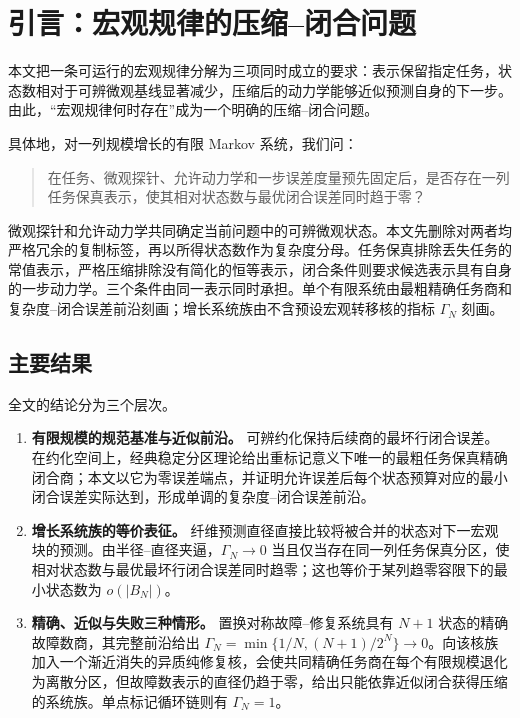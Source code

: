 \section{引言：宏观规律的压缩--闭合问题}
\label{sec:introduction}

本文把一条可运行的宏观规律分解为三项同时成立的要求：表示保留指定任务，状态数相对于可辨微观基线显著减少，压缩后的动力学能够近似预测自身的下一步。由此，“宏观规律何时存在”成为一个明确的压缩--闭合问题。

具体地，对一列规模增长的有限 Markov 系统，我们问：

\begin{quote}
在任务、微观探针、允许动力学和一步误差度量预先固定后，是否存在一列任务保真表示，使其相对状态数与最优闭合误差同时趋于零？
\end{quote}

微观探针和允许动力学共同确定当前问题中的可辨微观状态。本文先删除对两者均严格冗余的复制标签，再以所得状态数作为复杂度分母。任务保真排除丢失任务的常值表示，严格压缩排除没有简化的恒等表示，闭合条件则要求候选表示具有自身的一步动力学。三个条件由同一表示同时承担。单个有限系统由最粗精确任务商和复杂度--闭合误差前沿刻画；增长系统族由不含预设宏观转移核的指标 $\Gamma_N$ 刻画。

\subsection{主要结果}

全文的结论分为三个层次。

\begin{enumerate}
  \item \textbf{有限规模的规范基准与近似前沿。} 可辨约化保持后续商的最坏行闭合误差。在约化空间上，经典稳定分区理论给出重标记意义下唯一的最粗任务保真精确闭合商；本文以它为零误差端点，并证明允许误差后每个状态预算对应的最小闭合误差实际达到，形成单调的复杂度--闭合误差前沿。
  \item \textbf{增长系统族的等价表征。} 纤维预测直径直接比较将被合并的状态对下一宏观块的预测。由半径--直径夹逼，$\Gamma_N\to0$ 当且仅当存在同一列任务保真分区，使相对状态数与最优最坏行闭合误差同时趋零；这也等价于某列趋零容限下的最小状态数为 $o(|B_N|)$。
  \item \textbf{精确、近似与失败三种情形。} 置换对称故障--修复系统具有 $N+1$ 状态的精确故障数商，其完整前沿给出 $\Gamma_N=\min\{1/N,(N+1)/2^N\}\to0$。向该核族加入一个渐近消失的异质纯修复核，会使共同精确任务商在每个有限规模退化为离散分区，但故障数表示的直径仍趋于零，给出只能依靠近似闭合获得压缩的系统族。单点标记循环链则有 $\Gamma_N=1$。
\end{enumerate}

